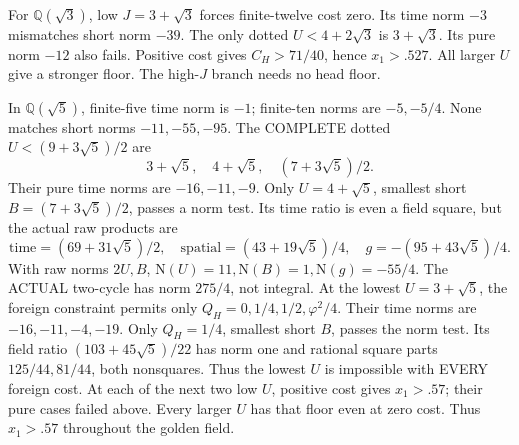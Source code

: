 \documentclass[11pt]{article}
\begin{document}
For \(\mathbb Q(\sqrt3)\), low \(J=3+\sqrt3\)
forces finite-twelve cost zero.
Its time norm \(-3\) mismatches
short norm \(-39\).
The only dotted \(U<4+2\sqrt3\)
is \(3+\sqrt3\).
Its pure norm \(-12\) also fails.
Positive cost gives \(C_H>71/40\),
hence \(x_1>.527\).
All larger \(U\) give a stronger floor.
The high-\(J\) branch needs no head floor.

In \(\mathbb Q(\sqrt5)\), finite-five
time norm is \(-1\); finite-ten norms
are \(-5,-5/4\).
None matches short norms \(-11,-55,-95\).
The COMPLETE dotted \(U<(9+3\sqrt5)/2\)
are
\[
                         3+\sqrt5,\quad4+\sqrt5,\quad(7+3\sqrt5)/2 .
\]
Their pure time norms are \(-16,-11,-9\).
Only \(U=4+\sqrt5\), smallest short
\(B=(7+3\sqrt5)/2\), passes a norm test.
Its time ratio is even a field square,
but the actual raw products are
\[
 \text{time}=(69+31\sqrt5)/2,\quad
 \text{spatial}=(43+19\sqrt5)/4,\quad
                         g=-(95+43\sqrt5)/4 .
\]
With raw norms \(2U,B\),
\(\mathrm N(U)=11,\mathrm N(B)=1,
\mathrm N(g)=-55/4\).
The ACTUAL two-cycle has norm \(275/4\),
not integral.
At the lowest \(U=3+\sqrt5\), the foreign
constraint permits only
\(Q_H=0,1/4,1/2,\varphi^2/4\).
Their time norms are
\(-16,-11,-4,-19\).
Only \(Q_H=1/4\), smallest short \(B\),
passes the norm test.
Its field ratio \((103+45\sqrt5)/22\)
has norm one and rational square parts
\(125/44,81/44\), both nonsquares.
Thus the lowest \(U\) is impossible
with EVERY foreign cost.
At each of the next two low \(U\),
positive cost gives \(x_1>.57\);
their pure cases failed above.
Every larger \(U\) has that floor
even at zero cost.
Thus \(x_1>.57\) throughout the golden field.
\end{document}
